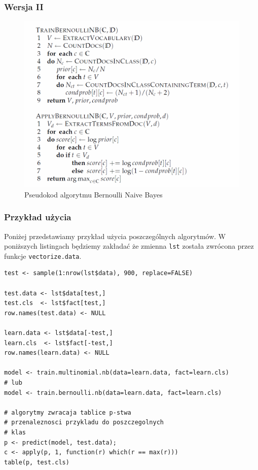 \documentclass[a4paper,12pt]{article}
\begin{document}
		\subsubsection{Wersja II}
		\begin{figure}[!h]
			\centering
			\includegraphics[scale=0.45]{./img/bnbalg}
			\caption{Pseudokod algorytmu Bernoulli Naive Bayes}
		\end{figure}		

		\subsubsection{Przykład użycia}
		Poniżej przedstawiamy przykład użycia poszczególnych algorytmów.
		W poniższych listingach będziemy zakładać że zmienna \texttt{lst}
		została zwrócona przez funkcje \texttt{vectorize.data}.
		\begin{verbatim}
test <- sample(1:nrow(lst$data), 900, replace=FALSE)

test.data <- lst$data[test,]
test.cls  <- lst$fact[test,]
row.names(test.data) <- NULL

learn.data <- lst$data[-test,]
learn.cls  <- lst$fact[-test,]
row.names(learn.data) <- NULL

model <- train.multinomial.nb(data=learn.data, fact=learn.cls)
# lub
model <- train.bernoulli.nb(data=learn.data, fact=learn.cls)

# algorytmy zwracaja tablice p-stwa
# przenaleznosci przykladu do poszczegolnych
# klas
p <- predict(model, test.data);
c <- apply(p, 1, function(r) which(r == max(r)))
table(p, test.cls)
		\end{verbatim}
		
\end{document}
